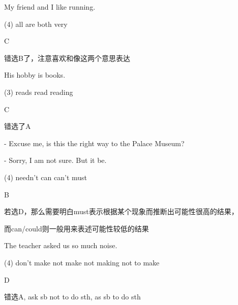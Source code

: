 \begin{question}[tags={xiaoxuect}]
My friend and I \blank[width=1cm]{} like running.

  \begin{tasks}(4)
    \task all
    \task are
    \task both
    \task very
  \end{tasks}

\end{question}
\begin{solution}
C

错选B了，注意喜欢和像这两个意思表达
\end{solution}

\begin{question}[tags={xiaoxuect}]
His hobby is \blank[width=1cm]{} books.

  \begin{tasks}(3)
    \task reads
    \task read
    \task reading
  \end{tasks}

\end{question}
\begin{solution}
C

错选了A
\end{solution}

\begin{question}[tags={xiaoxuect}]
- Excuse me, is this the right way to the Palace Museum?

\noindent - Sorry, I am not sure. But it \blank[width=1cm]{} be.

  \begin{tasks}(4)
    \task needn't
    \task can
    \task can't
    \task must
  \end{tasks}

\end{question}
\begin{solution}
B

若选D，那么需要明白must表示根据某个现象而推断出可能性很高的结果，

而can/could则一般用来表述可能性较低的结果
\end{solution}



\begin{question}[tags={xiaoxuect}]
The teacher asked us \blank[width=1cm]{} so much noise.

  \begin{tasks}(4)
    \task don't make
    \task not make
    \task not making
    \task not to make
  \end{tasks}

\end{question}
\begin{solution}
D

错选A, ask sb not to do sth, as sb to do sth
\end{solution}


